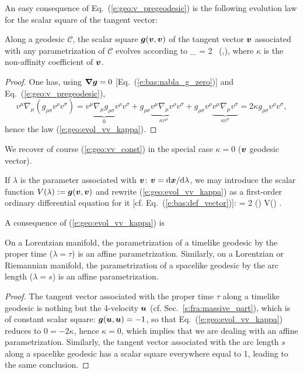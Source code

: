 An easy consequence of Eq.~(\ref{e:geo:v_pregeodesic}) is the following
evolution law for the scalar square of the tangent vector:
\begin{greybox}
Along a geodesic $\mathcal{C}$, the scalar square $\bm{g}(\bm{v},\bm{v})$
of the tangent vector $\bm{v}$ associated with any parametrization of $\mathcal{C}$
evolves according to
\be \label{e:geo:evol_vv_kappa}
    \wnab_{\!} \left[ \w{g}(\w{v},\w{v}) \right] = 2 \kappa \, (,),
\ee
where $\kappa$ is the non-affinity coefficient of $\bm{v}$.
\end{greybox}
\begin{proof}
One has, using $\bm{\nabla}\bm{g}=0$ [Eq.~(\ref{e:bas:nabla_g_zero})] and Eq.~(\ref{e:geo:v_pregeodesic}),
\[
    v^\mu \nabla_\mu (g_{\rho\sigma} v^\rho v^\sigma)  = v^\mu \underbrace{\nabla_\mu g_{\rho\sigma}}_{0} v^\rho v^\sigma
                + g_{\rho\sigma} \underbrace{v^\mu \nabla_\mu v^\rho}_{\kappa v^\rho} v^\sigma
                + g_{\rho\sigma} v^\rho \underbrace{v^\mu \nabla_\mu v^\sigma}_{\kappa v^\sigma}
             = 2 \kappa  g_{\rho\sigma} v^\rho v^\sigma  ,
\]
hence the law (\ref{e:geo:evol_vv_kappa}).
\end{proof}
We recover of course (\ref{e:geo:vv_const}) in the special case $\kappa = 0$
($\bm{v}$ geodesic vector).
\begin{remark}
If $\lambda$ is the parameter associated with $\bm{v}$: $\bm{v} = \mathrm{d}\bm{x}/\mathrm{d}\lambda$,
we may introduce the scalar function $V(\lambda) := \bm{g}(\bm{v},\bm{v})$ and
rewrite (\ref{e:geo:evol_vv_kappa}) as a first-order ordinary differential equation
for it [cf. Eq.~(\ref{e:bas:def_vector})]:
\be
     = 2 \kappa(\lambda) V(\lambda) .
\ee
\end{remark}
A consequence of (\ref{e:geo:evol_vv_kappa}) is
\begin{greybox}
On a Lorentzian manifold, the parametrization of a timelike geodesic
by the proper time ($\lambda = \tau$) is an affine parametrization.
Similarly, on a Lorentzian or Riemannian manifold, the parametrization of a
spacelike geodesic
by the arc length ($\lambda = s$) is an affine parametrization.
\end{greybox}
\begin{proof}
The tangent vector associated with the proper time $\tau$ along a timelike geodesic
is nothing but the 4-velocity $\bm{u}$ (cf. Sec.~\ref{s:fra:massive_part}), which
is of constant scalar square: $\bm{g}(\bm{u},\bm{u}) = -1$, so that Eq.~(\ref{e:geo:evol_vv_kappa})
reduces to $0 = -2 \kappa$, hence $\kappa=0$, which implies that we are dealing
with an affine parametrization. Similarly, the tangent vector associated with the
arc length $s$ along a spacelike geodesic has a scalar square everywhere equal
to 1, leading to the same conclusion.
\end{proof}

